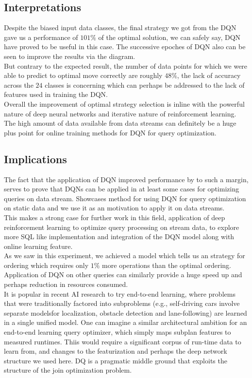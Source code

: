 \subsection{Interpretations}
Despite the biased input data classes, the final strategy we got from the DQN gave us a performance of $101\%$ of the optimal solution, we can safely say, DQN have proved to be useful in this case. The successive epoches of DQN also can be seen to improve the results via the diagram.\\
But contrary to the expected result, the number of data points for which we were able to predict to optimal move correctly are roughly $48\%$, the lack of accuracy across the $24$ classes is concerning which can perhaps be addressed to the lack of features used in training the DQN.\\
Overall the improvement of optimal strategy selection is inline with the powerful nature of deep neural networks and iterative nature of reinforcement learning. The high amount of data available from data streams can definitely be a huge plus point for online training methods for DQN for query optimization.\\


\subsection{Implications}
The fact that the application of DQN improved performance by to such a margin, serves to prove that DQNs can be applied in at least some cases for optimizing queries on data stream. \cite{drl_dbms} Showcases method for using DQN for query optimization on  static data and we use it as an motivation to apply it on data streams.  \\
This makes a strong case for further work in this field, application of deep reinforcement learning to optimize query processing on stream data, to explore more SQL like implementation and integration of the DQN model along with online learning feature.\\
As we saw in this experiment, we achieved a model which tells us an strategy for ordering which requires only $1\%$ more operations than the optimal ordering. Application of DQN on other queries can similarly provide a huge speed up and perhaps reduction in resources consumed. \\
\cite{drl_dbms}It is popular in recent AI research to try end-to-end learning, where problems that were traditionally factored into subproblems (e.g., self-driving cars involve separate modelsfor localization, obstacle detection and lane-following) are learned in a single unified model. One can imagine a similar architectural ambition for an end-to-end learning query optimizer, which simply maps subplan features to measured runtimes. Thiis would require a significant corpus of run-time data to learn from, and changes to the featurization and perhaps the deep network structure we used here. DQ is a pragmatic middle ground that exploits the structure of the join optimization problem. 

